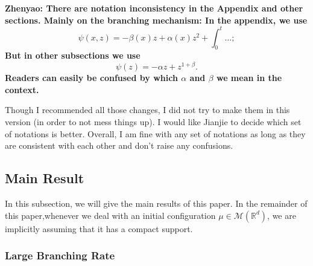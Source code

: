 \documentclass[12pt,oneside,english]{amsart}
\theoremstyle{plain}
\theoremstyle{definition}
\numberwithin{equation}{section}
\begin{document}
    {\bf Zhenyao: There are notation inconsistency in the Appendix and other sections. Mainly on the branching mechanism: In the appendix, we use
\[
    \psi(x,z)= -\beta(x)z+\alpha(x)z^2 + \int_0^t \dots;
\]
    But in other subsections we use
\[
    \psi(z) = - \alpha z + z^{1+\beta}.
\]
    Readers can easily be confused by which $\alpha$ and $\beta$ we mean in the context.

    Though I recommended all those changes, I did not try to make them in this version (in order to not mess things up). I would like Jianjie to decide which set of notations is better. Overall, I am fine with any set of notations as long as they are consistent with each other and don't raise any confusions.}

\subsection{Main Result}

In this subsection, we will give the main results of this paper. In the remainder of this paper,whenever we deal with an initial configuration $\mu \in \mathcal{M}(\mathbb{R}^d)$, we are implicitly assuming that it has a compact support.
\subsubsection{Large Branching Rate}
\end{document}
